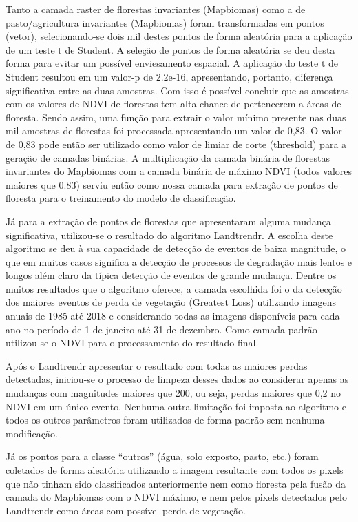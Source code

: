 Tanto a camada raster de florestas invariantes (Mapbiomas) como a de pasto/agricultura invariantes (Mapbiomas) foram transformadas em pontos (vetor), selecionando-se dois mil destes pontos de forma aleatória para a aplicação de um teste t de Student. A seleção de pontos de forma aleatória se deu desta forma para evitar um possível enviesamento espacial. A aplicação do teste t de Student resultou em um valor-p de 2.2e-16, apresentando, portanto, diferença significativa entre as duas amostras. Com isso é possível concluir que as amostras com os valores de NDVI de florestas tem alta chance de pertencerem a áreas de floresta. Sendo assim, uma função para extrair o valor mínimo presente nas duas mil amostras de florestas foi processada apresentando um valor de 0,83. O valor de 0,83 pode então ser utilizado como valor de limiar de corte (threshold) para a geração de camadas binárias. A multiplicação da camada binária de florestas invariantes do Mapbiomas com a camada binária de máximo NDVI (todos valores maiores que 0.83) serviu então como nossa camada para extração de pontos de floresta para o treinamento do modelo de classificação.

Já para a extração de pontos de florestas que apresentaram alguma mudança significativa, utilizou-se o resultado do algoritmo Landtrendr. A escolha deste algoritmo se deu à sua capacidade de detecção de eventos de baixa magnitude, o que em muitos casos significa a detecção de processos de degradação mais lentos e longos além claro da típica detecção de eventos de grande mudança. Dentre os muitos resultados que o algoritmo oferece, a camada escolhida foi o da detecção dos maiores eventos de perda de vegetação (Greatest Loss) utilizando imagens anuais de 1985 até 2018 e considerando todas as imagens disponíveis para cada ano no período de 1 de janeiro até 31 de dezembro. Como camada padrão utilizou-se o NDVI para o processamento do resultado final.

Após o Landtrendr apresentar o resultado com todas as maiores perdas detectadas, iniciou-se o processo de limpeza desses dados ao considerar apenas as mudanças com magnitudes maiores que 200, ou seja, perdas maiores que 0,2 no NDVI em um único evento. Nenhuma outra limitação foi imposta ao algoritmo e todos os outros parâmetros foram utilizados de forma padrão sem nenhuma modificação.

Já os pontos para a classe “outros” (água, solo exposto, pasto, etc.) foram coletados de forma aleatória utilizando a imagem resultante com todos os pixels que não tinham sido classificados anteriormente nem como floresta pela fusão da camada do Mapbiomas com o NDVI máximo, e nem pelos pixels detectados pelo Landtrendr como áreas com possível perda de vegetação.

